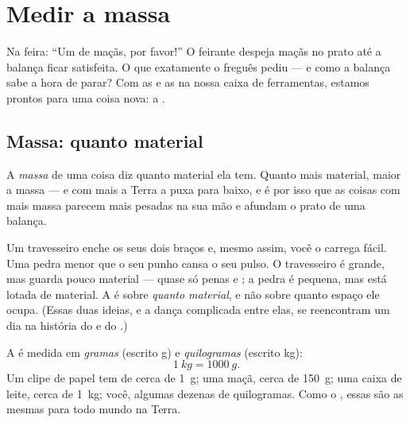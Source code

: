 \chapter{Medir a massa}\label{ch:g3:measuring-mass}

Na feira: ``Um  de maçãs, por favor!'' O feirante despeja
maçãs no prato até a balança ficar satisfeita. O que exatamente o
freguês pediu --- e como a balança sabe a hora de parar? Com as
 e as  na nossa caixa de ferramentas,
estamos prontos para  uma coisa nova: a .

\section{Massa: quanto material}

\begin{definition}[Massa]\label{def:g3:measuring-mass:mass}
A \emph{massa} de uma coisa diz quanto material ela tem.
Quanto mais material, maior a massa --- e com mais  a Terra a
puxa para baixo, e é por isso que as coisas com mais massa parecem
mais pesadas na sua mão e afundam o prato de uma balança.
\end{definition}

\begin{example}\label{ex:g3:measuring-mass:bignotcheavy}
Um travesseiro enche os seus dois braços e, mesmo assim, você o
carrega fácil. Uma pedra menor que o seu punho cansa o seu pulso. O
travesseiro é grande, mas guarda pouco material --- quase só penas e
; a pedra é pequena, mas está lotada de material. A  é sobre
\emph{quanto material}, e não sobre quanto espaço ele ocupa. (Essas
duas ideias, e a dança complicada entre elas, se reencontram um dia
na história do  e do .)
\end{example}

\begin{definition}\label{def:g3:measuring-mass:units}
A  é medida em \emph{gramas} (escrito \unit{g}) e
\emph{quilogramas} (escrito \unit{kg}):
\[
\qty{1}{kg} = \qty{1000}{g}.
\]
Um clipe de papel tem  de cerca de \qty{1}{g}; uma maçã, cerca
de \qty{150}{g}; uma caixa de leite, cerca de \qty{1}{kg}; você,
algumas dezenas de quilogramas. Como o , essas  são as
mesmas para todo mundo na Terra.
\end{definition}

